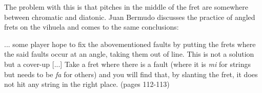 The problem with this is that pitches in the middle of the fret are somewhere between
chromatic and diatonic.  Juan Bermudo discusses the practice of angled frets on the
vihuela and comes to the same conclusions:
\begin{blocks}
... some player hope to fix the abovementioned faults by putting the frets where the said
faults occur at an angle, taking them out of line. This is not a solution but a cover-up
[...] Take a fret where there is a fault (where it is \textit{mi} for strings but needs to
be \textit{fa} for others) and you will find that, by slanting the fret, it does not hit
any string in the right place. (pages 112-113)
\end{blocks}





